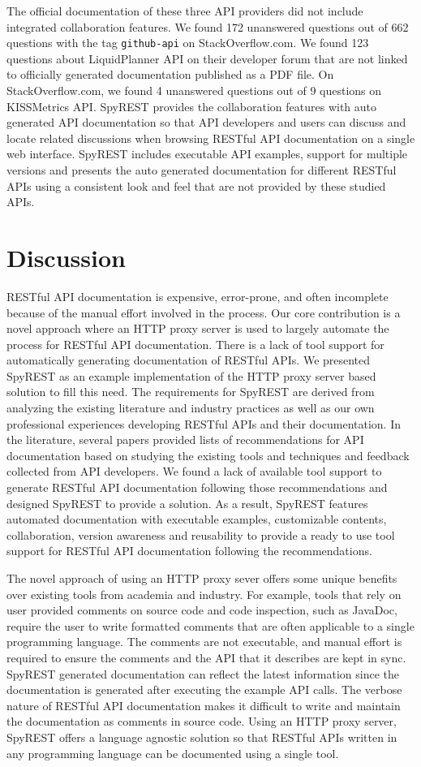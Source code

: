 \documentclass[conference]{IEEEtran}
\begin{document}
The official documentation of these three API providers did not include integrated collaboration features. We found 172 unanswered questions out of 662 questions with the tag \texttt{github-api} on StackOverflow.com. We found 123 questions about LiquidPlanner API on their developer forum that are not linked to officially generated documentation published as a PDF file. On StackOverflow.com, we found 4 unanswered questions out of 9 questions on KISSMetrics API. SpyREST provides the collaboration features with auto generated API documentation so that API developers and users can discuss and locate related discussions when browsing RESTful API documentation on a single web interface. SpyREST includes executable API examples, support for multiple versions and presents the auto generated documentation for different RESTful APIs using a consistent look and feel that are not provided by these studied APIs.

\section{Discussion}
RESTful API documentation is expensive, error-prone, and often incomplete because of the manual effort involved in the process. Our core contribution is a novel approach where an HTTP proxy server is used to largely automate the process for RESTful API documentation. There is a lack of tool support for automatically generating documentation of RESTful APIs. We presented SpyREST as an example implementation of the HTTP proxy server based solution to fill this need. The requirements for SpyREST are derived from analyzing the existing literature and industry practices as well as our own professional experiences developing RESTful APIs and their documentation. In the literature, several papers provided lists of recommendations for API documentation based on studying the existing tools and techniques and feedback collected from API developers. We found a lack of available tool support to generate RESTful API documentation following those recommendations and designed SpyREST to provide a solution. As a result, SpyREST features automated documentation with executable examples, customizable contents, collaboration, version awareness and reusability to provide a ready to use tool support for RESTful API documentation following the recommendations.

The novel approach of using an HTTP proxy sever offers some unique benefits over existing tools from academia and industry. For example, tools that rely on user provided comments on source code and code inspection, such as JavaDoc, require the user to write formatted comments that are often applicable to a single programming language. The comments are not executable, and manual effort is required to ensure the comments and the API that it describes are kept in sync. SpyREST generated documentation can reflect the latest information since the documentation is generated after executing the example API calls. The verbose nature of RESTful API documentation makes it difficult to write and maintain the documentation as comments in source code. Using an HTTP proxy server, SpyREST offers a language agnostic solution so that RESTful APIs written in any programming language can be documented using a single tool.
\end{document}
